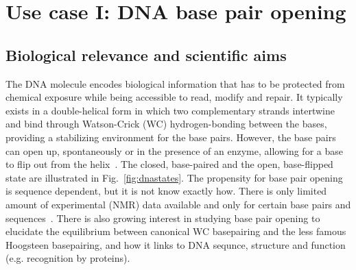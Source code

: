 \documentclass[11pt,a4paper]{article}
\begin{document}
\section{Use case I: DNA base pair opening}

\subsection{Biological relevance and scientific aims}
The DNA molecule encodes biological information that has to be protected from chemical exposure while being accessible to read, modify and repair. It typically exists in a double-helical form in which two complementary strands intertwine and bind through Watson-Crick (WC) hydrogen-bonding between the bases, providing a stabilizing environment for the base pairs. However, the base pairs can open up, spontaneously or in the presence of an enzyme, allowing for a base to flip out from the helix~\cite{knips2017both}. The closed, base-paired and the open, base-flipped state are illustrated in Fig.~\ref{fig:dnastates}. The propensity for base pair opening  is sequence dependent, but it is not know exactly how. There is only limited amount of experimental (NMR) data available and only for certain  base pairs and sequences~\cite{}. There is also growing interest in studying base pair opening to elucidate the equilibrium between canonical WC basepairing and the less famous Hoogsteen basepairing, and how it links to DNA sequnce, structure and function~\cite{nikolova2011transient, chakraborty2017energy, klimavicz2018energy, xu2018modulation} (e.g. recognition by proteins).
\end{document}
